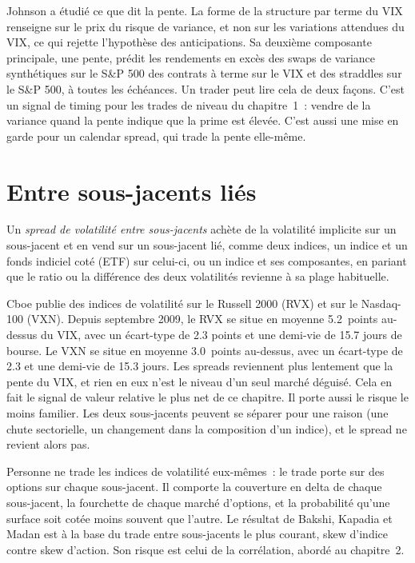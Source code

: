 Johnson a étudié ce que dit la pente. La forme de la structure par terme du VIX renseigne sur le prix du risque de variance, et non sur les variations attendues
du VIX, ce qui rejette l'hypothèse des anticipations. Sa deuxième composante principale, une pente, prédit les rendements en excès des swaps de variance synthétiques sur le S\&P 500
des contrats à terme sur le VIX et des straddles sur le S\&P 500, à toutes les échéances. Un trader peut lire cela de deux façons. C'est un signal de timing pour les trades de
niveau du chapitre~1~: vendre de la variance quand la pente indique que la prime est élevée. C'est aussi une mise en garde pour un calendar spread, qui trade la pente elle-même.

\section{Entre sous-jacents liés}

\begin{definition}\label{def:s2:skew-and-term-structure-relative-value:cross}
Un \emph{spread de volatilité entre sous-jacents} achète de la volatilité implicite sur un sous-jacent et en vend sur un
sous-jacent lié, comme deux indices, un indice et un fonds indiciel coté (ETF) sur celui-ci, ou un indice et ses composantes, en pariant que le ratio ou la différence des
deux volatilités revienne à sa plage habituelle.
\end{definition}

Cboe publie des indices de volatilité sur le Russell 2000 (RVX) et sur le Nasdaq-100 (VXN). Depuis septembre 2009, le RVX se situe en moyenne 5.2~points au-dessus du
VIX, avec un écart-type de 2.3 points et une demi-vie de 15.7 jours de bourse. Le VXN se situe en moyenne 3.0~points au-dessus, avec un écart-type de 2.3 et
une demi-vie de 15.3 jours. Les spreads reviennent plus lentement que la pente du VIX, et rien en eux n'est le niveau d'un seul marché déguisé. Cela en fait
le signal de valeur relative le plus net de ce chapitre. Il porte aussi le risque le moins familier. Les deux sous-jacents peuvent se séparer pour une raison (une
chute sectorielle, un changement dans la composition d'un indice), et le spread ne revient alors pas.

Personne ne trade les indices de volatilité eux-mêmes~: le trade porte sur des options sur chaque sous-jacent. Il comporte la couverture en delta de chaque sous-jacent, la fourchette de chaque
marché d'options, et la probabilité qu'une surface soit cotée moins souvent que l'autre. Le résultat de Bakshi, Kapadia et Madan est à la base du
trade entre sous-jacents le plus courant, skew d'indice contre skew d'action. Son risque est celui de la corrélation, abordé au chapitre~2.

